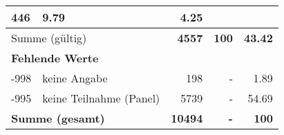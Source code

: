\begin{longtable}{lXrrr}
       \num{446} &
       \num[round-mode=places,round-precision=2]{9.79} &
         \num[round-mode=places,round-precision=2]{4.25} \\
     \midrule
     \multicolumn{2}{l}{Summe (gültig)} &
       \textbf{\num{4557}} &
     \textbf{\num{100}} &
       \textbf{\num[round-mode=places,round-precision=2]{43.42}} \\
     \multicolumn{5}{l}{\textbf{Fehlende Werte}}\\
       -998 &
       keine Angabe &
         \num{198} &
        - &
         \num[round-mode=places,round-precision=2]{1.89} \\
       -995 &
       keine Teilnahme (Panel) &
         \num{5739} &
        - &
         \num[round-mode=places,round-precision=2]{54.69} \\
     \midrule
     \multicolumn{2}{l}{\textbf{Summe (gesamt)}} &
          \textbf{\num{10494}} &
        \textbf{-} &
        \textbf{\num{100}} \\
     \bottomrule
     \end{longtable}
     
